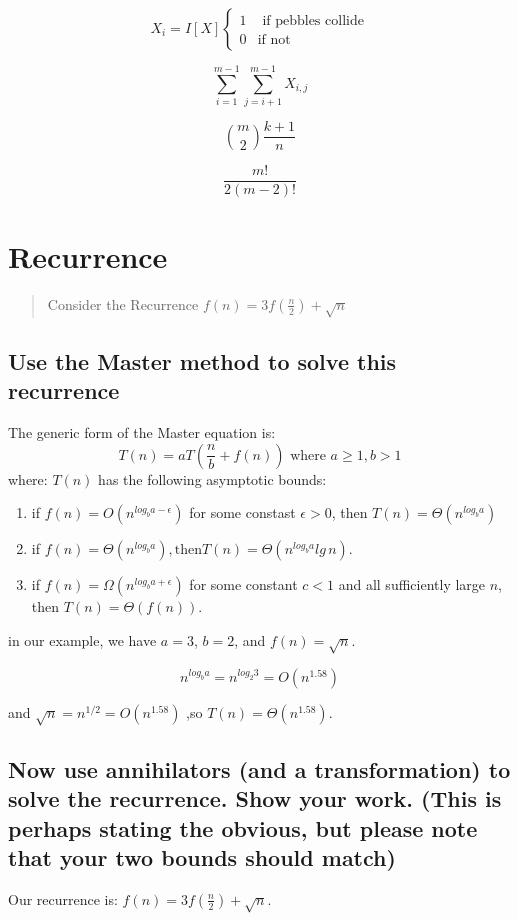 \documentclass[titlepage]{article}\usepackage[]{graphicx}\usepackage[]{color}
\begin{document}
\[
	X_i = I[X]
	\begin{cases}
		1 & \text{ if pebbles collide} \\
		0 & \text{if not } 
	\end{cases}
\]


\[ \sum_{i=1}^{m-1} \sum_{j=i+1}^{m-1} X_{i,j} \] 

\[ {m \choose 2} \frac{k+1}{n} \]

\[ \frac{m!}{2(m-2)!} \]


\section{Recurrence}

\begin{quote}
	Consider the Recurrence $f(n) = 3f(\frac{n}{2}) + \sqrt{n}$
\end{quote}

\subsection{Use the Master method to solve this recurrence}
The generic form of the Master equation is:
\[ T(n) = aT\left(\frac{n}{b} + f(n)\right) \text{ where } a\geq 1, b> 1 \]
where:
$T(n)$ has the following asymptotic bounds:
\begin{enumerate}
	\item if $f(n) = O\left(n^{log_b a-\epsilon}\right)$ for some constast
		$\epsilon > 0$, then $T(n) = \Theta(n^{log_b a})$
	\item if $f(n) = \Theta(n^{log_b a}), \text{then} T(n) =
		\Theta\left(n^{log_b a} lg\,n\right)$. 
	\item if $f(n) = \Omega\left(n^{log_b a + \epsilon}\right)$ for some
		constant $c < 1$ and all sufficiently large $n$, then $T(n) =
		\Theta(f(n))$. 
\end{enumerate}

in our example, we have $a = 3$, $b = 2$, and $f(n) = \sqrt{n}$. 

\[ n^{log_b a} = n^{log_2 3} = O(n^{1.58}) \]

and $\sqrt{n} = n^{1/2} = O(n^{1.58})$ ,so $T(n) = \Theta(n^{1.58})$.

\subsection{Now use annihilators (and a transformation) to solve the recurrence. Show
your work. (This is perhaps stating the obvious, but please note that your two
bounds should match)}
Our recurrence is: $f(n) = 3f(\frac{n}{2}) + \sqrt{n}$. 
\end{document}
